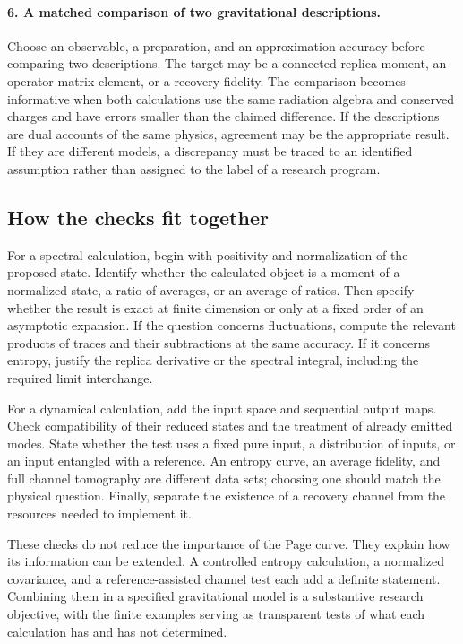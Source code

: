 \documentclass[11pt,letterpaper]{article}
\theoremstyle{plain}
\theoremstyle{definition}
\theoremstyle{remark}
\begin{document}
\paragraph{6. A matched comparison of two gravitational descriptions.}
Choose an observable, a preparation, and an approximation accuracy
before comparing two descriptions. The target may be a connected
replica moment, an operator matrix element, or a recovery fidelity.
The comparison becomes informative when both calculations use the
same radiation algebra and conserved charges and have errors smaller
than the claimed difference. If the descriptions are dual accounts of
the same physics, agreement may be the appropriate result. If they
are different models, a discrepancy must be traced to an identified
assumption rather than assigned to the label of a research program.

\subsection{How the checks fit together}
\label{subsec14:decision_tree}

For a spectral calculation, begin with positivity and normalization of
the proposed state. Identify whether the calculated object is a moment
of a normalized state, a ratio of averages, or an average of ratios.
Then specify whether the result is exact at finite dimension or only
at a fixed order of an asymptotic expansion. If the question concerns
fluctuations, compute the relevant products of traces and their
subtractions at the same accuracy. If it concerns entropy, justify the
replica derivative or the spectral integral, including the required
limit interchange.

For a dynamical calculation, add the input space and sequential output
maps. Check compatibility of their reduced states and the treatment of
already emitted modes. State whether the test uses a fixed pure input,
a distribution of inputs, or an input entangled with a reference. An
entropy curve, an average fidelity, and full channel tomography are
different data sets; choosing one should match the physical question.
Finally, separate the existence of a recovery channel from the resources
needed to implement it.

These checks do not reduce the importance of the Page curve. They
explain how its information can be extended. A controlled entropy
calculation, a normalized covariance, and a reference-assisted channel
test each add a definite statement. Combining them in a specified
gravitational model is a substantive research objective, with the
finite examples serving as transparent tests of what each calculation
has and has not determined.
\end{document}
